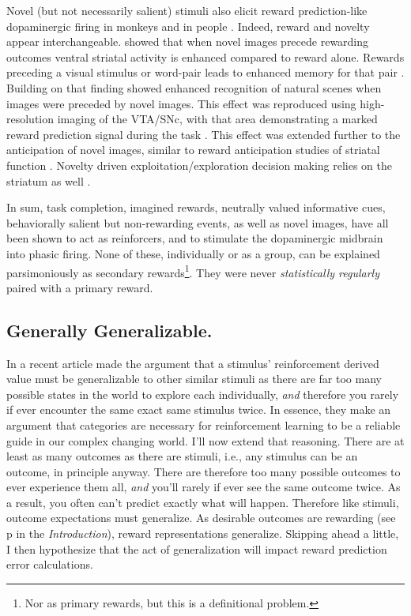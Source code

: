 \documentclass[doc,12pt]{apa}        %
\begin{document}
Novel (but not necessarily salient) stimuli also elicit reward prediction-like dopaminergic firing in monkeys \cite{Blatter:2006p6372} and in people \cite{Bunzeck:2006p5319}. Indeed, reward and novelty appear interchangeable.   showed that when novel images precede rewarding outcomes ventral striatal activity is enhanced compared to reward alone.  Rewards preceding a visual stimulus or word-pair leads to enhanced memory for that pair \cite{Lisman:2005p5455}.  Building on that finding  showed enhanced recognition of natural scenes when images were preceded by novel images.  This effect was reproduced using high-resolution imaging of the VTA/SNc, with that area demonstrating a marked reward prediction signal during the task \cite{Krebs:2011p8134}.  This effect was extended further to the anticipation of novel images, similar to reward anticipation studies of striatal function \cite{Knutson:2001p5234}.  Novelty driven exploitation/exploration decision making relies on the striatum as well \cite{Wittmann:2008p541}.

In sum, task completion, imagined rewards, neutrally valued informative cues, behaviorally salient but non-rewarding events, as well as novel images, have all been shown to act as reinforcers, and to stimulate the dopaminergic midbrain into phasic firing.  None of these, individually or as a group, can be explained parsimoniously as secondary rewards\footnote{
    Nor as primary rewards, but this is a definitional problem.
}.  They were never \emph{statistically regularly} paired with a primary reward.

\subsection{Generally Generalizable.}
\label{sub:gen}
In a recent article  made the argument that a stimulus' reinforcement derived value must be generalizable to other similar stimuli as there are far too many possible states in the world to explore each individually, \emph{and} therefore you rarely if ever encounter the same exact same stimulus twice.  In essence, they make an argument that categories are necessary for reinforcement learning to be a reliable guide in our complex changing world.  I'll now extend that reasoning.  There are at least as many outcomes as there are stimuli, i.e., any stimulus can be an outcome, in principle anyway. There are therefore too many possible outcomes to ever experience them all, \emph{and} you'll rarely if ever see the same outcome twice.  As a result, you often can't predict exactly what will happen. Therefore like stimuli, outcome expectations must generalize.  As desirable outcomes are rewarding (see p\pageref{sub:cogrew} in the \emph{Introduction}), reward representations generalize.  Skipping ahead a little, I then hypothesize that the act of generalization will impact reward prediction error calculations.
\end{document}
